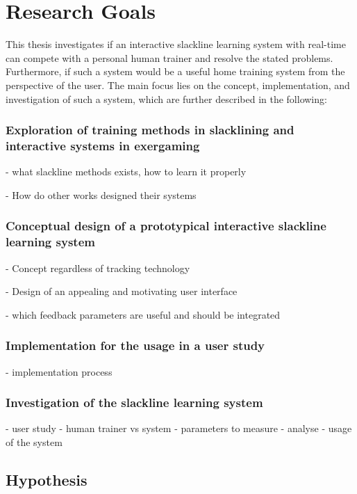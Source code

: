 \section{Research Goals}
This thesis investigates if an interactive slackline learning system with real-time can compete with a personal human trainer and resolve the stated problems. 
Furthermore, if such a system would be a useful home training system from the perspective of the user.
The main focus lies on the concept, implementation, and investigation of such a system, which are further described in the following:

\subsubsection{Exploration of training methods in slacklining and interactive systems in exergaming}
- what slackline methods exists, how to learn it properly

- How do other works designed their systems

\subsubsection{Conceptual design of a prototypical interactive slackline learning system}
- Concept regardless of tracking technology

- Design of an appealing and motivating user interface

- which feedback parameters are useful and should be integrated

\subsubsection{Implementation for the usage in a user study}
- implementation process

\subsubsection{Investigation of the slackline learning system}
- user study
- human trainer vs system
- parameters to measure
- analyse
- usage of the system

\begin{comment}
- Investigate related system

- Requirement analysis

- Conceptual design of an interactive feedback system for slacklining
-- Provide supportive feedback

- User interface design

- Integration

- Investigation of the system
\end{comment}
\subsection{Hypothesis}
\begin{comment}

- Show if an interactive real time feedback system is usable for this kind of sport

- If the learning progress is comparable with other training methods like human trainer

- If such a system motivates user for slackline exercises
\end{comment}